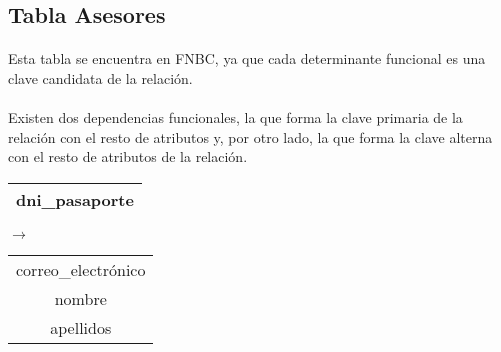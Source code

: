 \subsection{Tabla Asesores}

  \paragraph{}Esta tabla se encuentra en FNBC, ya que cada determinante
  funcional es una clave candidata de la relación.

  \paragraph{}Existen dos dependencias funcionales, la que forma la clave
  primaria de la relación con el resto de atributos y, por otro lado, la que
  forma la clave alterna con el resto de atributos de la relación.

  \begin{center}
    \begin{minipage}{3.7cm}{\begin{flushright}\begin{tabular}{ | c | }
                  \hline
                  dni\_pasaporte \\
                  \hline
                 \end{tabular}\end{flushright} }
    \end{minipage}
    \begin{minipage}{0.7cm}{$\longrightarrow$}
    \end{minipage}
    \begin{minipage}{5.9cm}{\begin{tabular}{ | c | }
                  \hline
                  correo\_electrónico \\
                  nombre \\
                  apellidos \\
                  \hline
                 \end{tabular} }
    \end{minipage}
  \end{center}

